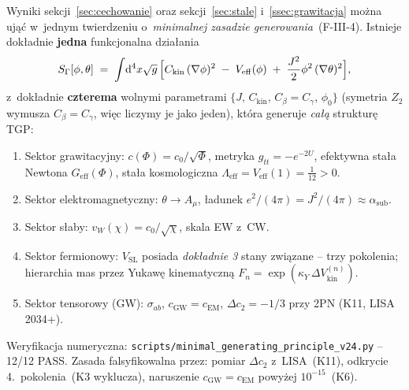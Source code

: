 \begin{remark}\label{rem:minimal-principle-v24}
Wyniki sekcji~\ref{sec:cechowanie} oraz sekcji~\ref{sec:stale} i~\ref{ssec:grawitacja}
można ująć w~jednym twierdzeniu o~\emph{minimalnej zasadzie generowania}~(F-III-4).
Istnieje dokładnie \textbf{jedna} funkcjonalna działania
\begin{equation}\label{eq:S-Gamma-full}
  S_{\Gamma}[\phi,\theta]
  \;=\;
  \int\!\mathrm{d}^4x\sqrt{g}\,
  \Bigl[
    C_{\mathrm{kin}}\,(\nabla\phi)^2
    \;-\; V_{\mathrm{eff}}(\phi)
    \;+\; \frac{J^2}{2}\phi^2\,(\nabla\theta)^2
  \Bigr],
\end{equation}
z~dokładnie \textbf{czterema} wolnymi parametrami
$\{J,\,C_{\mathrm{kin}},\,C_{\beta}=C_{\gamma},\,\phi_0\}$
(symetria $Z_2$ wymusza $C_\beta=C_\gamma$, więc liczymy je jako jeden),
która generuje \emph{całą} strukturę TGP:
\begin{enumerate}
  \item[\textbf{G}] Sektor grawitacyjny: $c(\Phi)=c_0/\sqrt{\Phi}$,
        metryka $g_{tt}=-e^{-2U}$, efektywna stała Newtona $G_{\mathrm{eff}}(\Phi)$,
        stała kosmologiczna $\Lambda_{\mathrm{eff}}=V_{\mathrm{eff}}(1)=\tfrac{1}{12}>0$.
  \item[\textbf{E}] Sektor elektromagnetyczny: $\theta\to A_\mu$, ładunek
        $e^2/(4\pi)=J^2/(4\pi)\approx\alpha_{\mathrm{sub}}$.
  \item[\textbf{W}] Sektor słaby: $v_W(\chi)=c_0/\sqrt{\chi}$, skala EW z~CW.
  \item[\textbf{F}] Sektor fermionowy: $V_{\mathrm{SL}}$ posiada \emph{dokładnie 3}
        stany związane -- trzy pokolenia; hierarchia mas przez Yukawę kinematyczną
        $F_n=\exp(\kappa_Y\,\Delta V_{\mathrm{kin}}^{(n)})$.
  \item[\textbf{T}] Sektor tensorowy (GW): $\sigma_{ab}$, $c_{\mathrm{GW}}=c_{\mathrm{EM}}$,
        $\Delta c_2=-1/3$ przy 2PN (K11, LISA 2034+).
\end{enumerate}
Weryfikacja numeryczna: \texttt{scripts/minimal\_generating\_principle\_v24.py} -- 12/12 PASS\@.
Zasada falsyfikowalna przez: pomiar $\Delta c_2$ z~LISA~(K11), odkrycie 4.~pokolenia~(K3
wyklucza), naruszenie $c_{\mathrm{GW}}=c_{\mathrm{EM}}$ powyżej $10^{-15}$~(K6).
\end{remark}

